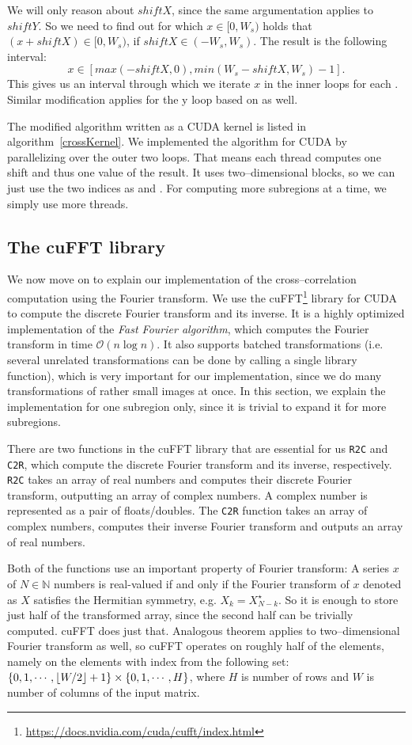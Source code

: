 We will only reason about $shiftX$, since the same argumentation applies to $shiftY$. So we need to find out for which $x \in [0, W_s)$ holds that $(x + shiftX) \in [0, W_s)$, if $shiftX \in (-W_s, W_s)$. The result is the following interval:
\[
x \in [max(-shiftX, 0), min(W_s - shiftX, W_s) - 1].
\]
This gives us an interval through which we iterate $x$ in the inner loops for each . Similar modification applies for the y loop based on  as well.

The modified algorithm written as a CUDA kernel is listed in algorithm~\ref{crossKernel}. We implemented the algorithm for CUDA by parallelizing over the outer two loops. That means each thread computes one shift and thus one value of the result. It uses two--dimensional blocks, so we can just use the two indices as  and . For computing more subregions at a time, we simply use more threads.

\subsection{The cuFFT library}
We now move on to explain our implementation of the cross--correlation computation using the Fourier transform. We use the cuFFT\footnote{\url{https://docs.nvidia.com/cuda/cufft/index.html}} library for CUDA to compute the discrete Fourier transform and its inverse. It is a highly optimized implementation of the \emph{Fast Fourier algorithm}, which computes the Fourier transform in time $\mathcal{O}(n \log n)$. It also supports batched transformations (i.e. several unrelated transformations can be done by calling a single library function), which is very important for our implementation, since we do many transformations of rather small images at once. In this section, we explain the implementation for one subregion only, since it is trivial to expand it for more subregions.

There are two functions in the cuFFT library that are essential for us \texttt{R2C} and \texttt{C2R}, which compute the discrete Fourier transform and its inverse, respectively. \texttt{R2C} takes an array of real numbers and computes their discrete Fourier transform, outputting an array of complex numbers. A complex number is represented as a pair of floats/doubles. The \texttt{C2R} function takes an array of complex numbers, computes their inverse Fourier transform and outputs an array of real numbers.

Both of the functions use an important property of Fourier transform: A series $x$ of $N \in \mathbb{N}$ numbers is real-valued if and only if the Fourier transform of $x$ denoted as $X$ satisfies the Hermitian symmetry, e.g. $X_k = X_{N-k}^\star$. So it is enough to store just half of the transformed array, since the second half can be trivially computed. cuFFT does just that. Analogous theorem applies to two--dimensional Fourier transform as well, so cuFFT operates on roughly half of the elements, namely on the elements with index from the following set: $\{0,1,\cdots, \lfloor W/2\rfloor + 1\} \times \{0, 1, \cdots, H\}$, where $H$ is number of rows and $W$ is number of columns of the input matrix.

